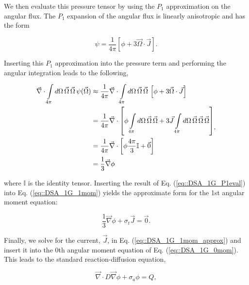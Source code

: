 \noindent We then evaluate this pressure tensor by using the $P_1$ approximation on the angular flux. The $P_1$ expansion of the angular flux is linearly anisotropic and has the form

\begin{equation}
\label{eq::DSA_1G_P1approx}
\psi = \frac{1}{4 \pi} \left[ \phi + 3 \vec{\Omega} \cdot \vec{J}  \right].
\end{equation}

\noindent Inserting this $P_1$ approximation into the pressure term and performing the angular integration leads to the following,

\begin{equation}
\label{eq::DSA_1G_P1eval}
\begin{aligned}
\vec{\nabla} \cdot  \int\displaylimits_{4 \pi}  d \Omega \, \vec{\Omega}\, \vec{\Omega} \, \psi (\vec{\Omega}) &\approx \frac{1}{4 \pi} \vec{\nabla} \cdot \int\displaylimits_{4 \pi}  d \Omega \, \vec{\Omega}\, \vec{\Omega} \, \left[ \phi + 3 \vec{\Omega} \cdot \vec{J} \right] \\
&= \frac{1}{4 \pi} \vec{\nabla} \cdot \left[  \phi  \int\displaylimits_{4 \pi}  d \Omega \, \vec{\Omega}\, \vec{\Omega}    + 3 \vec{J}  \int\displaylimits_{4 \pi}  d \Omega \, \vec{\Omega}\, \vec{\Omega} \, \vec{\Omega}   \right] \\
&= \frac{1}{4 \pi} \vec{\nabla} \cdot \left[ \phi  \frac{4 \pi}{3} \mathbb{I} + \vec{0} \right] \\
&= \frac{1}{3} \vec{\nabla} \phi
\end{aligned} ,
\end{equation}

\noindent where $\mathbb{I}$ is the identity tensor. Inserting the result of Eq. (\ref{eq::DSA_1G_P1eval}) into Eq. (\ref{eq::DSA_1G_1mom}) yields the approximate form for the 1st angular moment equation:

\begin{equation}
\label{eq::DSA_1G_1mom_approx}
\frac{1}{3} \vec{\nabla} \phi+ \sigma_t \vec{J} = \vec{0} .
\end{equation}

\noindent Finally, we solve for the current, $\vec{J}$, in Eq. (\ref{eq::DSA_1G_1mom_approx}) and insert it into the 0th angular moment equation of Eq. (\ref{eq::DSA_1G_0mom}). This leads to the standard reaction-diffusion equation,

\begin{equation}
\label{eq::DSA_1G_diffeq_FINAL}
\vec{\nabla} \cdot D \vec{\nabla} \phi + \sigma_a \phi =  Q ,
\end{equation}


